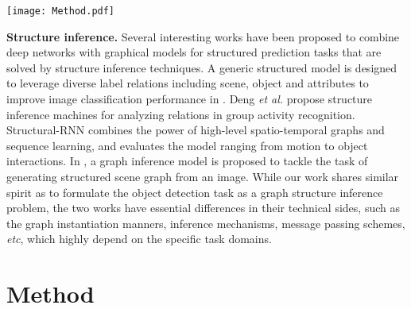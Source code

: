 \documentclass[10pt,twocolumn,letterpaper]{article}
\begin{document}
\begin{figure*}
\vspace{-3ex}
\begin{center}
	\texttt{[image: Method.pdf]}
\end{center}
\vspace{-2ex}
\caption{{\bf SIN: The Framework of Our Method.} Firstly we get a fixed number of ROIs from an input image. Each ROI is pooled into a fixed-size feature map and then mapped to a feature vector by a fully connected layer as {\em node}. We extract the whole image feature as {\em scene} in the same way, and then we concatenate the descriptors of every two ROIs into {\em edges}. To iteratively update the node state, an elaborately designed structure inference method is triggered, and the final state of each node is used to predict the category and refine the location of the corresponding ROI. The whole framework is trained end-to-end with the original multi-task loss (this study exploits Faster R-CNN as the  base detection framework).}
\label{fig:method}
\vspace{-2.5ex}
\end{figure*}

{\bf Structure inference.} Several interesting works \cite{More, GNN, GSNN, VQA, SI, SIM, IN, SRNN, SGG} have been proposed to combine deep networks with graphical models for structured prediction tasks that are solved by structure inference techniques. A generic structured model is designed to leverage diverse label relations including scene, object and attributes to improve image classification performance in \cite{SI}. Deng {\em et al.} \cite{SIM} propose structure inference machines for analyzing relations in group activity recognition. Structural-RNN \cite{SRNN} combines the power of high-level spatio-temporal graphs and sequence learning, and evaluates the model ranging from motion to object interactions. In \cite{SGG}, a graph inference model is proposed to tackle the task of generating structured scene graph from an image. 
While our work shares similar spirit as \cite{SGG} to formulate the object detection task as a graph structure inference problem, the two works have essential differences in their technical sides, such as the graph instantiation manners, inference mechanisms, message passing schemes, {\em etc}, which highly depend on the specific task domains.

\section{Method}
\end{document}
